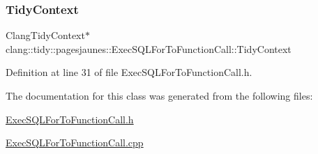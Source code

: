 \subsubsection{\texorpdfstring{Tidy\+Context}{TidyContext}}
{\footnotesize\ttfamily Clang\+Tidy\+Context$\ast$ clang\+::tidy\+::pagesjaunes\+::\+Exec\+S\+Q\+L\+For\+To\+Function\+Call\+::\+Tidy\+Context}



Definition at line 31 of file Exec\+S\+Q\+L\+For\+To\+Function\+Call.\+h.



The documentation for this class was generated from the following files\+:\begin{DoxyCompactItemize}
\item 
\hyperlink{_exec_s_q_l_for_to_function_call_8h}{Exec\+S\+Q\+L\+For\+To\+Function\+Call.\+h}\item 
\hyperlink{_exec_s_q_l_for_to_function_call_8cpp}{Exec\+S\+Q\+L\+For\+To\+Function\+Call.\+cpp}\end{DoxyCompactItemize}
